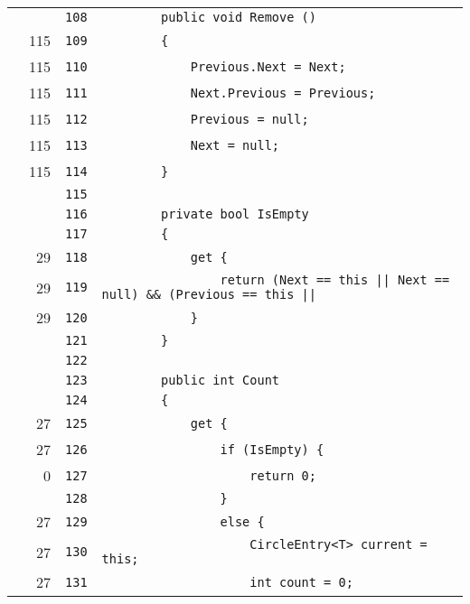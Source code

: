 \documentclass[a4paper,10pt]{article}
\begin{document}
\begin{longtable}[l]{lrrl}
\cellcolor{gray} &  & \verb~108~ & \verb~        public void Remove ()~\\
\cellcolor{green} & 115 & \verb~109~ & \verb~        {~\\
\cellcolor{green} & 115 & \verb~110~ & \verb~            Previous.Next = Next;~\\
\cellcolor{green} & 115 & \verb~111~ & \verb~            Next.Previous = Previous;~\\
\cellcolor{green} & 115 & \verb~112~ & \verb~            Previous = null;~\\
\cellcolor{green} & 115 & \verb~113~ & \verb~            Next = null;~\\
\cellcolor{green} & 115 & \verb~114~ & \verb~        }~\\
\cellcolor{gray} &  & \verb~115~ & \verb~~\\
\cellcolor{gray} &  & \verb~116~ & \verb~        private bool IsEmpty~\\
\cellcolor{gray} &  & \verb~117~ & \verb~        {~\\
\cellcolor{green} & 29 & \verb~118~ & \verb~            get {~\\
\cellcolor{green} & 29 & \verb~119~ & \verb~                return (Next == this || Next == null) && (Previous == this || ~\\
\cellcolor{green} & 29 & \verb~120~ & \verb~            }~\\
\cellcolor{gray} &  & \verb~121~ & \verb~        }~\\
\cellcolor{gray} &  & \verb~122~ & \verb~~\\
\cellcolor{gray} &  & \verb~123~ & \verb~        public int Count~\\
\cellcolor{gray} &  & \verb~124~ & \verb~        {~\\
\cellcolor{green} & 27 & \verb~125~ & \verb~            get {~\\
\cellcolor{green} & 27 & \verb~126~ & \verb~                if (IsEmpty) {~\\
\cellcolor{red} & 0 & \verb~127~ & \verb~                    return 0;~\\
\cellcolor{gray} &  & \verb~128~ & \verb~                }~\\
\cellcolor{green} & 27 & \verb~129~ & \verb~                else {~\\
\cellcolor{green} & 27 & \verb~130~ & \verb~                    CircleEntry<T> current = this;~\\
\cellcolor{green} & 27 & \verb~131~ & \verb~                    int count = 0;~\\

\end{longtable}
\end{document}
